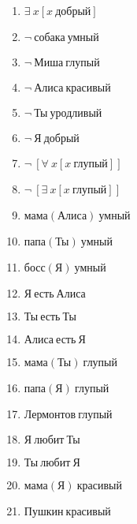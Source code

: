 \documentclass{article}
\begin{document}
\begin{enumerate}
\item $\exists \ x[x \ \text{добрый}]$

\item $\neg \ \text{собака} \ \text{умный}$

\item $\neg \ \text{Миша} \ \text{глупый}$

\item $\neg \ \text{Алиса} \ \text{красивый}$

\item $\neg \ \text{Ты} \ \text{уродливый}$

\item $\neg \ \text{Я} \ \text{добрый}$

\item $\neg \ [\forall \ x[x \ \text{глупый}]]$

\item $\neg \ [\exists \ x[x \ \text{глупый}]]$

\item $\text{мама}(\text{Алиса}) \ \text{умный}$

\item $\text{папа}(\text{Ты}) \ \text{умный}$

\item $\text{босс}(\text{Я}) \ \text{умный}$

\item $\text{Я} \ \text{есть} \ \text{Алиса}$

\item $\text{Ты} \ \text{есть} \ \text{Ты}$

\item $\text{Алиса} \ \text{есть} \ \text{Я}$

\item $\text{мама}(\text{Ты}) \ \text{глупый}$

\item $\text{папа}(\text{Я}) \ \text{глупый}$

\item $\text{Лермонтов} \ \text{глупый}$

\item $\text{Я} \ \text{любит} \ \text{Ты}$

\item $\text{Ты} \ \text{любит} \ \text{Я}$

\item $\text{мама}(\text{Я}) \ \text{красивый}$

\item $\text{Пушкин} \ \text{красивый}$


\end{enumerate}
\end{document}
